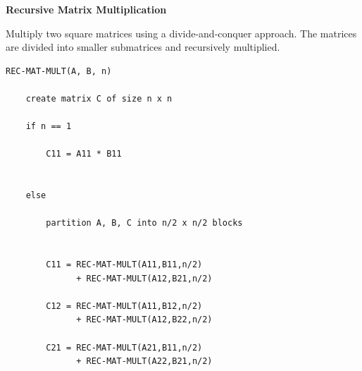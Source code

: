 \documentclass[a4paper,12pt]{article}
\begin{document}
\begin{tcolorbox}[
    colback=gray!30,
    colframe=black,
    boxrule=1pt,
    arc=0mm
]

\begin{tcolorbox}[
    colback=gray!10,
    colframe=black,
    arc=0mm
]
\centering
{\Huge\bfseries Recursive Matrix Multiplication}
\end{tcolorbox}


\begin{tcolorbox}[
    colback=gray!10,
    colframe=black,
    arc=0mm
]
\small
Multiply two square matrices using a divide-and-conquer approach.
The matrices are divided into smaller submatrices and recursively multiplied.
\end{tcolorbox}


\begin{tcolorbox}[
    colback=black!5,
    colframe=black,
    arc=0mm,
    title=Pseudo-code
]
\tiny
\begin{lstlisting}
REC-MAT-MULT(A, B, n)

    create matrix C of size n x n

    if n == 1

        C11 = A11 * B11


    else

        partition A, B, C into n/2 x n/2 blocks


        C11 = REC-MAT-MULT(A11,B11,n/2)
              + REC-MAT-MULT(A12,B21,n/2)

        C12 = REC-MAT-MULT(A11,B12,n/2)
              + REC-MAT-MULT(A12,B22,n/2)

        C21 = REC-MAT-MULT(A21,B11,n/2)
              + REC-MAT-MULT(A22,B21,n/2)


\end{lstlisting}
\end{tcolorbox}
\end{tcolorbox}
\end{document}
